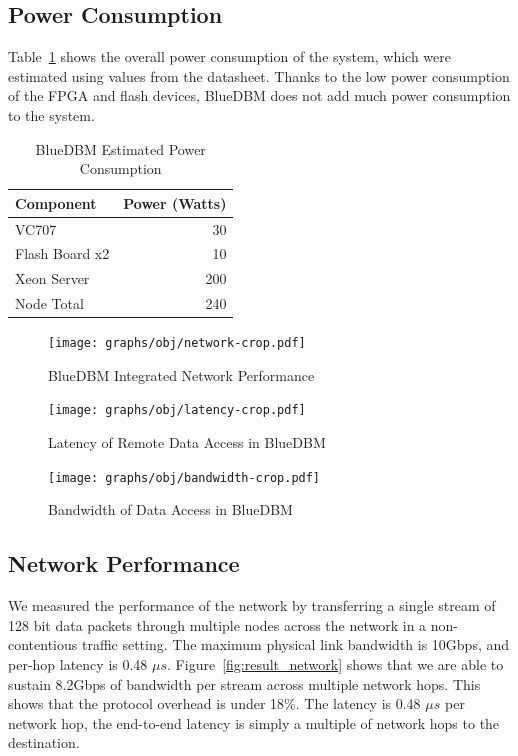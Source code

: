 \subsection{Power Consumption}
Table~\ref{tab:power} shows the overall power consumption of the system, which
were estimated using values from the datasheet. Thanks to the low power
consumption of the FPGA and flash devices, BlueDBM does not add much power
consumption to the system.

\begin{table}[h]\footnotesize
\centering
\begin{tabular}{l | r}
Component & Power (Watts) \\
\hline \hline
VC707 & 30 \\
Flash Board x2 & 10 \\
Xeon Server & 200 \\
\hline
Node Total & 240 \\

\end{tabular}
\caption{BlueDBM Estimated Power Consumption}
\label{tab:power}
\end{table}

\begin{figure}[ht]
\centering
\vspace{0pt}
\begin{minipage}[c]{.3\textwidth}
	\texttt{[image: graphs/obj/network-crop.pdf]}
	\caption{BlueDBM Integrated Network Performance}
	\label{fig:result_network}
\end{minipage}\hfill
\vspace{0pt}
\begin{minipage}[c]{.3\textwidth}
	\texttt{[image: graphs/obj/latency-crop.pdf]}
	\caption{Latency of Remote Data Access in BlueDBM}
	\label{fig:result_latency}
\end{minipage}\hfill
\vspace{0pt}
\begin{minipage}[c]{.3\textwidth}
	\texttt{[image: graphs/obj/bandwidth-crop.pdf]}
	\caption{Bandwidth of Data Access in BlueDBM}
	\label{fig:result_bandwidth}
\end{minipage}
\end{figure}

\subsection{Network Performance}

We measured the performance of the network by transferring a single stream of 128 bit data packets through multiple nodes across the network in a non-contentious traffic setting. The maximum physical link bandwidth is 10Gbps, and per-hop latency is 0.48 $\mu s$.
Figure~\ref{fig:result_network} shows that we are able to sustain 8.2Gbps of bandwidth per stream across multiple network hops. This shows that the protocol overhead is under 18\%. The latency is 0.48 $\mu s$ per network hop, the end-to-end latency is simply a multiple of network hops to the destination. 

